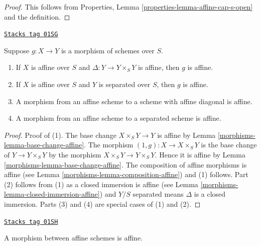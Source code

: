 \begin{proof}
This follows from Properties, Lemma \ref{properties-lemma-affine-cap-s-open}
and the definition.
\end{proof}

\begin{lemma}
\label{morphisms-lemma-affine-permanence}
\href{https://stacks.math.columbia.edu/tag/01SG}{\texttt{Stacks tag 01SG}}

Suppose $g : X \to Y$ is a morphism of schemes over $S$.
\begin{enumerate}
\item If $X$ is affine over $S$ and $\Delta : Y \to Y \times_S Y$ is affine,
then $g$ is affine.
\item If $X$ is affine over $S$ and $Y$ is separated over $S$,
then $g$ is affine.
\item A morphism from an affine scheme to a scheme with affine
diagonal is affine.
\item A morphism from an affine scheme to a separated scheme is affine.
\end{enumerate}
\end{lemma}

\begin{proof}

Proof of (1). The base change $X \times_S Y \to Y$ is affine by
Lemma \ref{morphisms-lemma-base-change-affine}.
The morphism $(1, g) : X \to X \times_S Y$ is the base change of
$Y \to Y \times_S Y$ by the morphism $X \times_S Y \to Y \times_S Y$.
Hence it is affine by
Lemma \ref{morphisms-lemma-base-change-affine}.
The composition of affine morphisms is affine
(see Lemma \ref{morphisms-lemma-composition-affine}) and (1) follows.
Part (2) follows from (1) as a closed immersion is affine
(see Lemma \ref{morphisms-lemma-closed-immersion-affine}) and $Y/S$ separated
means $\Delta$ is a closed immersion. Parts (3) and (4) are special
cases of (1) and (2).
\end{proof}

\begin{lemma}
\label{morphisms-lemma-morphism-affines-affine}
\href{https://stacks.math.columbia.edu/tag/01SH}{\texttt{Stacks tag 01SH}}

A morphism between affine schemes is affine.
\end{lemma}

